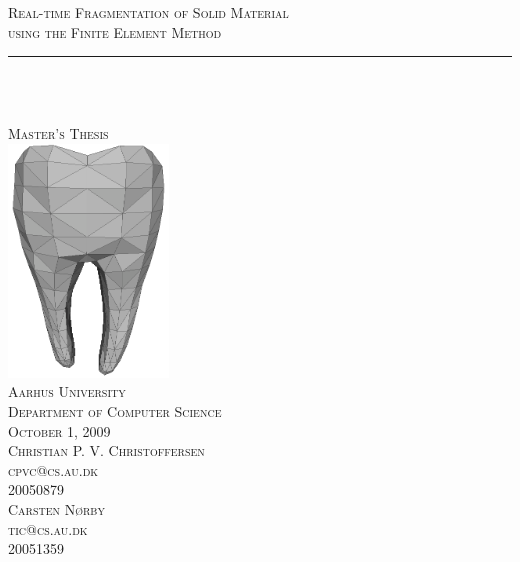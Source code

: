
 
\newcommand{\HRule}{\rule{\linewidth}{0.5mm}}
 
%
\begin{center}

\textsc{\Large 
  Real-time Fragmentation of Solid Material \\
  \vspace{2mm}
  using the Finite Element Method}\\[0.5cm] 

\begin{minipage}{0.9\textwidth}
\HRule \\
\end{minipage}\\%
\textsc{\large Master's Thesis}\\[1.5cm]


\includegraphics[width=0.32\textwidth]{./images/titlepage_highres.png}\\[0.5cm]


\textsc{\Large Aarhus University}\\[0.1cm]
\textsc{\normalsize Department of Computer Science}\\[0.1cm]
\textsc{\normalsize October 1, 2009}\\[1.0cm]


\textsc{
  Christian P. V. Christoffersen \\
  cpvc@cs.au.dk \\
  20050879  \\
\vspace{5mm}
  Carsten Nørby \\
  tic@cs.au.dk \\
  20051359
}\\[0.8cm]



\end{center}
